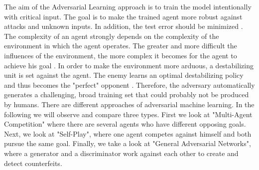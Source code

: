 The aim of the Adversarial Learning approach is to train the model intentionally with critical input. The goal is to make the trained agent more robust against attacks and unknown inputs. In addition, the test error should be minimized \cite{MachineLearningAtScale}.
The complexity of an agent strongly depends on the complexity of the environment in which the agent operates. The greater and more difficult the influences of the environment, the more complex it becomes for the agent to achieve his goal \cite{environmentBansal2017Oct}.
In order to make the environment more arduous, a destabilizing unit is set against the agent. The enemy learns an optimal destabilizing policy and thus becomes the "perfect" opponent \cite{robustPinto2017Mar}. Therefore, the adversary automatically generates a challenging, broad training set that could probably not be produced by humans.
There are different approaches of adversarial machine learning. In the following we will observe and compare three types. First we look at "Multi-Agent Competition" where there are several agents who have different opposing goals. Next, we look at "Self-Play", where one agent competes against himself and both pursue the same goal. Finally, we take a look at "General Adversarial Networks", where a generator and a discriminator work against each other to create and detect counterfeits.